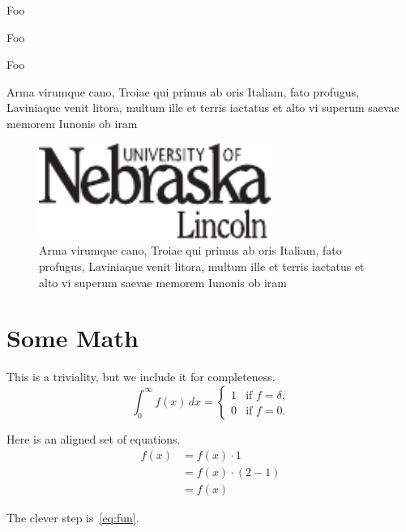 \documentclass[ms,testing]{nuthesis}
\begin{document}
\begin{table}[h]
  \centering

  \begin{compactitem}[\checkmark]
    \item Foo
    \item Foo
    \item Foo
    \end{compactitem}

  \caption{Arma virumque cano, Troiae qui primus ab oris Italiam, fato profugus,
Laviniaque venit litora, multum ille et terris iactatus et alto vi
superum saevae memorem Iunonis ob iram}
  \label{tab:list}
\end{table}

\begin{figure}[h]
  \centering
  \includegraphics[width=3in]{unl}
  \caption{Arma virumque cano, Troiae qui primus ab oris Italiam, fato profugus,
Laviniaque venit litora, multum ille et terris iactatus et alto vi
superum saevae memorem Iunonis ob iram}
  \label{fig:test}
\end{figure}

\chapter{Some Math}\label{chap:math}

This is a triviality, but we include it for completeness.
\begin{equation}
\int_0^\infty f(x) \, dx =
\begin{cases} 1 & \mbox{if $f=\delta$,} \\
0 & \mbox{if $f=0$.} \end{cases}
\end{equation}

Here is an aligned set of equations.
\begin{align}
f(x) &= f(x) \cdot 1 \\
     &= f(x) \cdot (2-1)\label{eq:fun}\\
     &= f(x)
\end{align}

The clever step is~\eqref{eq:fun}.

\backmatter
\end{document}
